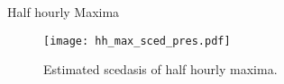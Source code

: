 \documentclass[notes]{beamer}
\begin{document}
\begin{frame}{Half hourly Maxima}
\begin{figure}
\centering
\texttt{[image: hh\_max\_sced\_pres.pdf]}
\caption{Estimated scedasis of half hourly maxima.}
\label{fig:hh_max_sced} 
\end{figure}
\end{frame}


\end{document}
